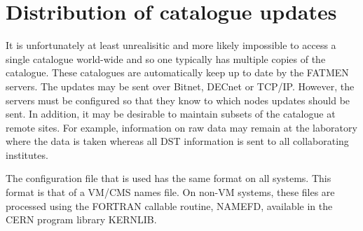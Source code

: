 \chapter{Distribution of catalogue updates}
\par
It is unfortunately at least unrealisitic and more likely impossible
to access a single catalogue world-wide and so one typically
has multiple copies of the catalogue. These catalogues
are automatically keep up to date by the FATMEN servers.
The updates may be sent over Bitnet, DECnet or TCP/IP.
However, the servers must be configured so that they
know to which nodes updates should be sent. In addition,
it may be desirable to maintain subsets of the catalogue
at remote sites. For example, information on raw data
may remain at the laboratory where the data is taken
whereas all DST information is sent to all collaborating
institutes. 
\par
{}
The configuration file that is used has the same format
on all systems. This format is that of a VM/CMS names file.
On non-VM systems, these files are processed using the
FORTRAN callable routine, NAMEFD, available in the CERN
program library KERNLIB.
